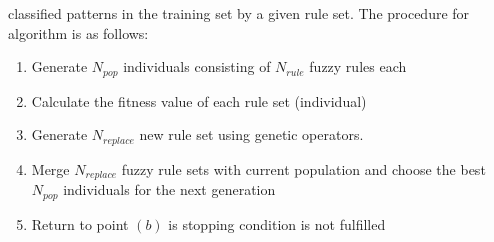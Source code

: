 \begin{enumerate}
        classified patterns in the training set by a given rule set.
        The procedure for algorithm is as follows:
        \begin{enumerate}
            \item Generate $N_{pop}$ individuals consisting of $N_{rule}$ fuzzy
                rules each
            \item Calculate the fitness value of each rule set (individual)
            \item Generate $N_{replace}$ new rule set using genetic operators.  
            \item Merge $N_{replace}$ fuzzy rule sets  with current population and
                choose the best $N_{pop}$ individuals for the next generation
            \item Return to point $(b)$ is stopping condition is not fulfilled
        \end{enumerate}
\end{enumerate}
